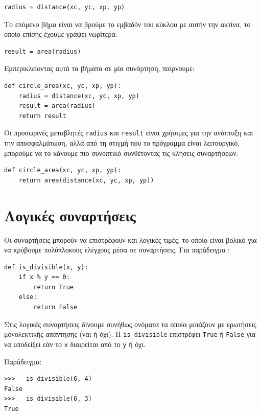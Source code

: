 \documentclass[10pt]{book}
\begin{document}
\begin{verbatim}
radius = distance(xc, yc, xp, yp)
\end{verbatim}
%

Το επόμενο βήμα είναι να βρούμε το εμβαδόν του κύκλου με αυτήν την ακτίνα,
το οποίο επίσης έχουμε γράψει νωρίτερα:

\begin{verbatim}
result = area(radius)
\end{verbatim}
%

Εμπερικλείοντας αυτά τα βήματα σε μία συνάρτηση, παίρνουμε:

\begin{verbatim}
def circle_area(xc, yc, xp, yp):
    radius = distance(xc, yc, xp, yp)
    result = area(radius)
    return result
\end{verbatim}
%

Οι προσωρινές μεταβλητές {\tt radius} και {\tt result} είναι
χρήσιμες για την ανάπτυξη και την αποσφαλμάτωση, αλλά από τη στιγμή που το πρόγραμμα είναι λειτουργικό, μπορούμε να το κάνουμε πιο συνοπτικό συνθέτοντας τις κλήσεις συναρτήσεων:

\begin{verbatim}
def circle_area(xc, yc, xp, yp):
    return area(distance(xc, yc, xp, yp))
\end{verbatim}
%


\section{Λογικές συναρτήσεις}
\label{boolean}

Οι συναρτήσεις μπορούν να επιστρέφουν και λογικές τιμές, το οποίο είναι
βολικό για να κρύβουμε πολύπλοκους ελέγχους μέσα σε συναρτήσεις.
Για παράδειγμα :

\begin{verbatim}
def is_divisible(x, y):
    if x % y == 0:
        return True
    else:
        return False
\end{verbatim}
%

Στις λογικές συναρτήσεις δίνουμε συνήθως ονόματα τα οποία μοιάζουν με ερωτήσεις
μονολεκτικής απάντησης (ναι ή όχι). Η \verb"is_divisible" επιστρέφει 
{\tt True} ή {\tt False} για να υποδείξει εάν το {\tt x} διαιρείται
από το {\tt y} ή όχι.

Παράδειγμα:

\begin{verbatim}
>>>   is_divisible(6, 4)
False
>>>   is_divisible(6, 3)
True
\end{verbatim}
%
\end{document}

